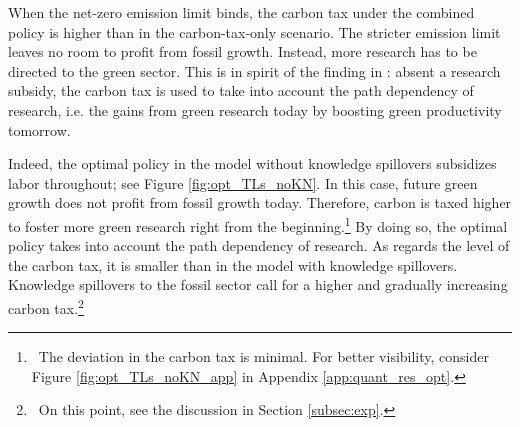 When the net-zero emission limit binds, the carbon tax under the combined policy is higher than in the carbon-tax-only scenario.
 The  stricter emission limit leaves no room to profit from fossil growth. Instead, more research has to be directed to the green sector. This is in spirit of the finding in \cite{Acemoglu2012TheChange}: absent a research subsidy, the carbon tax is used to take into account the path dependency of research, i.e. the gains from green research today by boosting green productivity tomorrow.
 
 Indeed, the optimal policy in the model without knowledge spillovers subsidizes labor throughout; see Figure \ref{fig:opt_TLs_noKN}. In this case, future green growth does not profit from fossil growth today. Therefore, carbon is taxed higher to foster more green research right from the beginning.\footnote{\ The deviation in the carbon tax is minimal. For better visibility, consider Figure \ref{fig:opt_TLs_noKN_app} in Appendix \ref{app:quant_res_opt}.} By doing so, the optimal policy takes into account the path dependency of research. As regards the level of the carbon tax, it is smaller than in the model with knowledge spillovers. Knowledge spillovers to the fossil sector call for a higher and gradually increasing carbon tax.\footnote{\ On this point, see the discussion in Section \ref{subsec:exp}.}

